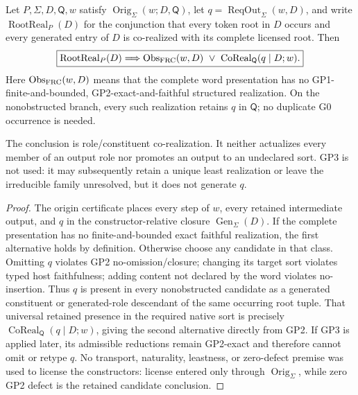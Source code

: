 \documentclass[12pt,a4paper]{article}
\begin{document}
\begin{theorem}
\label{p2a:thm:rooted-generated-image-corealization}
\label{p2a:thm:g0-witness-transport-derived-constructor}
Let \(P,\Sigma,D,\mathsf Q,w\) satisfy
\(\operatorname{Orig}_{\Sigma}(w;D,\mathsf Q)\), let
\(q=\operatorname{ReqOut}_{\Sigma}(w,D)\), and write
\(\operatorname{RootReal}_P(D)\) for the conjunction that every token root in
\(D\) occurs and every generated entry of \(D\) is co-realized with its
complete licensed root.  Then
\[
 \boxed{
 \operatorname{RootReal}_P(D)
 \Longrightarrow
 \operatorname{Obs}_{\rm FRC}(w,D)
 \ \vee\ 
 \operatorname{CoReal}_{\mathsf Q}(q\mid D;w).}
\]
Here \(\operatorname{Obs}_{\rm FRC}(w,D)\) means that the complete word
presentation has no GP1-finite-and-bounded, GP2-exact-and-faithful structured
realization.  On the nonobstructed branch, every such realization retains
\(q\) in \(\mathsf Q\); no duplicate G0 occurrence is needed.

The conclusion is role/constituent co-realization.  It neither actualizes every
member of an output role nor promotes an output to an undeclared sort.  GP3 is
not used: it may subsequently retain a unique least realization or leave the
irreducible family unresolved, but it does not generate \(q\).
\end{theorem}

\begin{proof}
The origin certificate places every step of \(w\), every retained intermediate
output, and \(q\) in the constructor-relative closure
\(\operatorname{Gen}_{\Sigma}(D)\).  If the complete presentation has no
finite-and-bounded exact faithful realization, the first alternative holds by
definition.  Otherwise choose any candidate in that class.  Omitting \(q\)
violates GP2 no-omission/closure; changing its target sort violates typed host
faithfulness; adding content not declared by the word violates no-insertion.
Thus \(q\) is present in every nonobstructed candidate as a generated
constituent or generated-role descendant of the same occurring root tuple.
That universal retained presence in the required native sort is precisely
\(\operatorname{CoReal}_{\mathsf Q}(q\mid D;w)\), giving the second
alternative directly from GP2.  If GP3 is applied later, its admissible
reductions remain GP2-exact and therefore cannot omit or retype \(q\).
No transport, naturality, leastness, or zero-defect premise was used to license
the constructors: license entered only through
\(\operatorname{Orig}_{\Sigma}\), while zero GP2 defect is the retained
candidate conclusion.
\end{proof}
\end{document}
